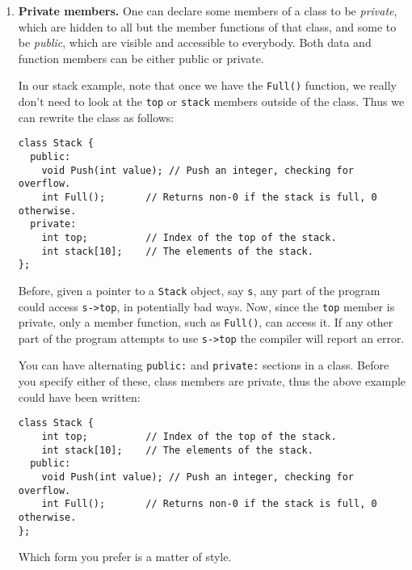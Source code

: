 \begin{enumerate}
\begin{verbatim}
int
Stack::Full()
{
    return (top == 10);
}
\end{verbatim}
Now we can rewrite {\tt Push} this way:
\begin{verbatim}
void
Stack::Push(int value)
{
    if (Full()) {
        fprintf(stderr, "Error: Stack overflow\n");
        exit(1);
    }
    
    stack[top++] = value;
}
\end{verbatim}
We could have written the line with {\tt Full()} this way also:
\begin{verbatim}
    if (this->Full()) {
\end{verbatim}
but in a member function, the \verb+this->+ is implicit.

The purpose of member functions is to encapsulate the functionality of
a type of object along with the data that the object contains.  A
member function does not take up space in an object of the class.

\item {\bf Private members.}  One can declare some
members of a class to be {\it private}, which are hidden to all but
the member functions of that class, and some to be {\it public}, which
are visible and accessible to everybody.  Both data and function members
can be either public or private.

In our stack example, note that once we have the {\tt Full()}
function, we really don't need to look at the {\tt top} or {\tt stack}
members outside of the class.  Thus we can rewrite the class as
follows:
\begin{verbatim}
class Stack {
  public:
    void Push(int value); // Push an integer, checking for overflow.
    int Full();       // Returns non-0 if the stack is full, 0 otherwise.
  private:
    int top;          // Index of the top of the stack.
    int stack[10];    // The elements of the stack.
};
\end{verbatim}
Before, given a pointer to a {\tt Stack} object, say {\tt s}, any part
of the program could access {\tt s->top}, in potentially bad ways.
Now, since the {\tt top} member is private, only a member function,
such as {\tt Full()}, can access it.  If any other part of the
program attempts to use {\tt s->top} the compiler will report an error.

You can have alternating {\tt public:} and {\tt private:} sections in
a class.  Before you specify either of these, class members are
private, thus the above example could have been written:
\begin{verbatim}
class Stack {
    int top;          // Index of the top of the stack.
    int stack[10];    // The elements of the stack.
  public:
    void Push(int value); // Push an integer, checking for overflow.
    int Full();       // Returns non-0 if the stack is full, 0 otherwise.
};
\end{verbatim}
Which form you prefer is a matter of style.


\end{enumerate}
